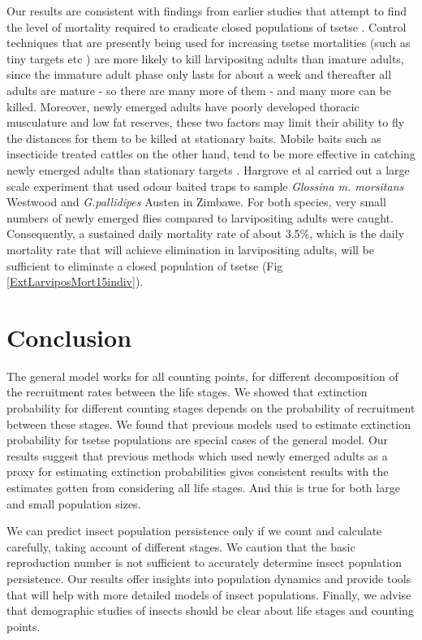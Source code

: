 \documentclass[smallextended]{svjour3}
\begin{document}
Our results are consistent with findings from earlier studies that attempt to find the level of mortality required to eradicate closed populations of tsetse \cite{Hargrove2005a, Kajunguri2019}. Control techniques that are presently being used for increasing tsetse mortalities (such as tiny targets etc \cite{Hargrove2000,Esterhuizen2006,Shaw2015,Mbewe2018a}) are more likely to kill larvipositng adults than imature adults, since the immature adult phase only lasts for  about a week and thereafter all adults are mature - so there are many more of them - and many more can be killed. Moreover, newly emerged adults have poorly developed thoracic musculature and low fat reserves, these two factors may limit their ability to fly the distances for them to be killed at stationary baits. Mobile baits such as insecticide treated cattles on the other hand, tend to be more effective in catching newly emerged adults than stationary targets \cite{Hargrove1991}. Hargrove et al \cite{HargroveJ.W.HollowayM.T.P.ValeG.A.GoughA.J.E.Hall1995} carried out a large scale experiment that used  odour baited traps to sample  {\it Glossina m. morsitans} Westwood and {\it G.pallidipes} Austen in Zimbawe. For both species, very small numbers of newly emerged flies compared to larvipositing adults were caught. Consequently, a sustained daily mortality rate of about 3.5\%, which is the daily mortality rate that will achieve elimination in larvipositing adults, will be sufficient to eliminate a closed population of tsetse (Fig \ref{ExtLarviposMort15indiv}).

\section{Conclusion}
\label{section9}
The general model works for all counting points, for different decomposition of the recruitment rates between the life stages. We showed that extinction probability for different counting stages depends on the probability of recruitment between these stages. We found that previous models used to estimate extinction probability for tsetse populations are special cases of the general model. Our results suggest that previous methods which used newly emerged adults as a proxy for estimating extinction probabilities gives consistent results with the estimates gotten from considering all life stages. And this is true for both large and small population sizes.


We can predict insect population persistence only if we count and calculate carefully, taking account of different stages. We caution that the basic reproduction number is not sufficient to accurately determine insect population persistence. Our results offer insights into population dynamics and provide tools that will help with more detailed models of insect populations. Finally, we advise that demographic studies of insects should be clear about life stages and counting points.
\end{document}
